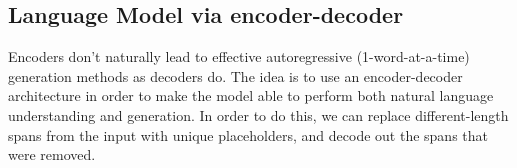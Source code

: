 \subsection{Language Model via encoder-decoder}
Encoders don’t naturally lead to effective autoregressive (1-word-at-a-time) generation methods as decoders do. The idea is to use an encoder-decoder architecture in order to make the model able to perform both natural language understanding and generation.\newline\newline
In order to do this, we can replace different-length spans from the input
with unique placeholders, and decode out the spans that were removed.

